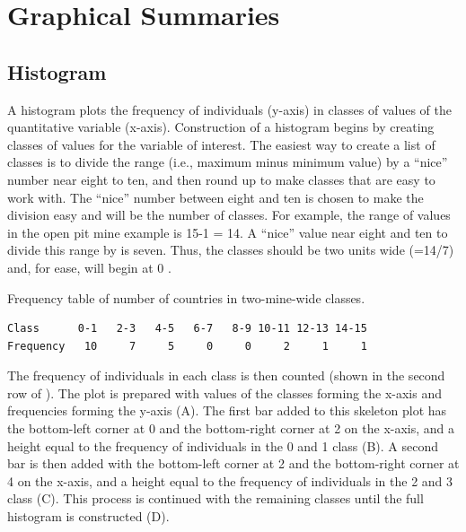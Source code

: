\documentclass[10pt,openany]{book}\usepackage[]{graphicx}\usepackage[]{color}
\begin{document}
\newpage
\section{Graphical Summaries}
\subsection{Histogram}
A histogram plots the frequency of individuals (y-axis) in classes of values of the quantitative variable (x-axis). Construction of a histogram begins by creating classes of values for the variable of interest. The easiest way to create a list of classes is to divide the range (i.e., maximum minus minimum value) by a ``nice'' number near eight to ten, and then round up to make classes that are easy to work with. The ``nice'' number between eight and ten is chosen to make the division easy and will be the number of classes. For example, the range of values in the open pit mine example is 15-1 = 14. A ``nice'' value near eight and ten to divide this range by is seven. Thus, the classes should be two units wide (=14/7) and, for ease, will begin at 0 .

\vspace{-6pt}
\begin{table}[htbp]
  \caption{Frequency table of number of countries in two-mine-wide classes.}
  \label{tab:MineFreqTable}
    \begin{Verbatim}[xleftmargin=25mm]
Class      0-1   2-3   4-5   6-7   8-9 10-11 12-13 14-15
Frequency   10     7     5     0     0     2     1     1
    \end{Verbatim}
\end{table}
\vspace{-12pt}

The frequency of individuals in each class is then counted (shown in the second row of ). The plot is prepared with values of the classes forming the x-axis and frequencies forming the y-axis (A). The first bar added to this skeleton plot has the bottom-left corner at 0 and the bottom-right corner at 2 on the x-axis, and a height equal to the frequency of individuals in the 0 and 1 class (B). A second bar is then added with the bottom-left corner at 2 and the bottom-right corner at 4 on the x-axis, and a height equal to the frequency of individuals in the 2 and 3 class (C). This process is continued with the remaining classes until the full histogram is constructed (D).
\end{document}

